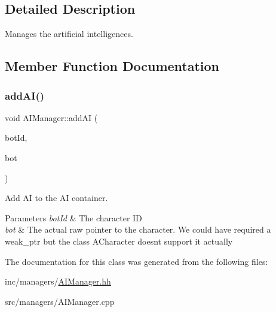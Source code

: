 \subsection{Detailed Description}
Manages the artificial intelligences. 

\subsection{Member Function Documentation}
\mbox{\label{classAIManager_aa50f2de11ad8c59ec56a505579565165}} 
\subsubsection{\texorpdfstring{add\+A\+I()}{addAI()}}
{\footnotesize\ttfamily void A\+I\+Manager\+::add\+AI (\begin{DoxyParamCaption}\item[{Unsigned\+Int}]{bot\+Id,  }\item[{A\+Character $\ast$}]{bot }\end{DoxyParamCaption})}



Add AI to the AI container. 


\begin{DoxyParams}{Parameters}
{\em bot\+Id} & The character ID \\
\hline
{\em bot} & The actual raw pointer to the character. We could have required a weak\+\_\+ptr but the class A\+Character doesnt support it actually \\
\hline
\end{DoxyParams}


The documentation for this class was generated from the following files\+:\begin{DoxyCompactItemize}
\item 
inc/managers/\hyperlink{AIManager_8hh}{A\+I\+Manager.\+hh}\item 
src/managers/A\+I\+Manager.\+cpp\end{DoxyCompactItemize}

